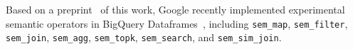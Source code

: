  Based on a preprint~\cite{patel_lotus_2024} of this work, Google recently implemented experimental semantic operators in BigQuery Dataframes~\cite{noauthor_python-bigquery-dataframesnotebooksexperimentalsemantic_operatorsipynb_nodate}, including \verb|sem_map|, \verb|sem_filter|, \verb|sem_join|, \verb|sem_agg|, \verb|sem_topk|, \verb|sem_search|, and \verb|sem_sim_join|. 









